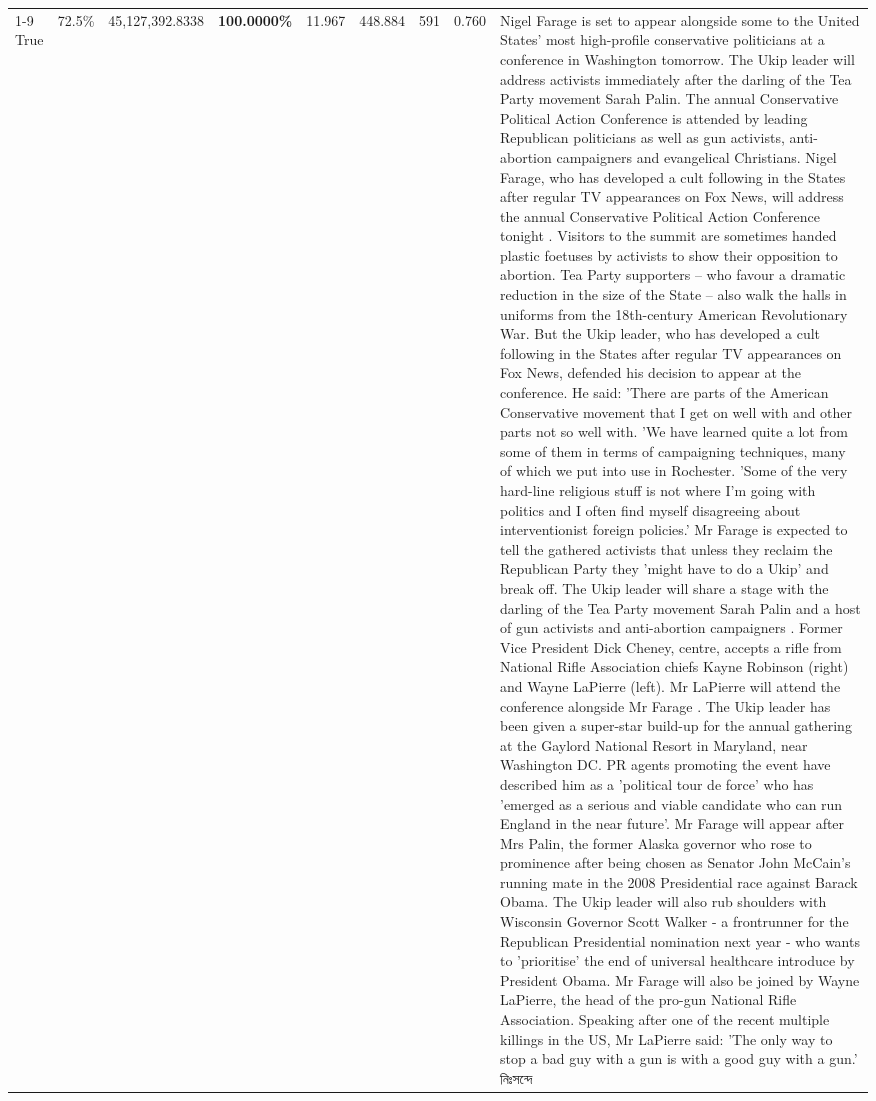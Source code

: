 \begin{table}[H]
\begin{tabular}{lllrlllll}
\cline{1-9}
True & 72.5\% & 45,127,392.8338 & \bfseries \color{red} 100.0000\% & 11.967 & 448.884 & 591 & 0.760 & Nigel Farage is set to appear alongside some to the United States' most high-profile conservative politicians at a conference in Washington tomorrow. The Ukip leader will address activists immediately after the darling of the Tea Party movement Sarah Palin. The annual Conservative Political Action Conference is attended by leading Republican politicians as well as gun activists, anti-abortion campaigners and evangelical Christians. Nigel Farage, who has developed a cult following in the States after regular TV appearances on Fox News, will address the annual Conservative Political Action Conference tonight . Visitors to the summit are sometimes handed plastic foetuses by activists to show their opposition to abortion. Tea Party supporters – who favour a dramatic reduction in the size of the State – also walk the halls in uniforms from the 18th-century American Revolutionary War. But the Ukip leader, who has developed a cult following in the States after regular TV appearances on Fox News, defended his decision to appear at the conference. He said: 'There are parts of the American Conservative movement that I get on well with and other parts not so well with. 'We have learned quite a lot from some of them in terms of campaigning techniques, many of which we put into use in Rochester. 'Some of the very hard-line religious stuff is not where I'm going with politics and I often find myself disagreeing about interventionist foreign policies.' Mr Farage is expected to tell the gathered activists that unless they reclaim the Republican Party they 'might have to do a Ukip' and break off. The Ukip leader will share a stage with the darling of the Tea Party movement Sarah Palin and a host of gun activists and anti-abortion campaigners . Former Vice President Dick Cheney, centre, accepts a rifle from National Rifle Association chiefs Kayne Robinson (right) and Wayne LaPierre (left). Mr LaPierre will attend the conference alongside Mr Farage . The Ukip leader has been given a super-star build-up for the annual gathering at the Gaylord National Resort in Maryland, near Washington DC. PR agents promoting the event have described him as a 'political tour de force' who has 'emerged as a serious and viable candidate who can run England in the near future'. Mr Farage will appear after Mrs Palin, the former Alaska governor who rose to prominence after being chosen as Senator John McCain's running mate in the 2008 Presidential race against Barack Obama. The Ukip leader will also rub shoulders with Wisconsin Governor Scott Walker - a frontrunner for the Republican Presidential nomination next year - who wants to 'prioritise' the end of universal healthcare introduce by President Obama. Mr Farage will also be joined by Wayne LaPierre, the head of the pro-gun National Rifle Association. Speaking after one of the recent multiple killings in the US, Mr LaPierre said: 'The only way to stop a bad guy with a gun is with a good guy with a gun.' নিঃসন্দে \\

\end{tabular}
\end{table}
